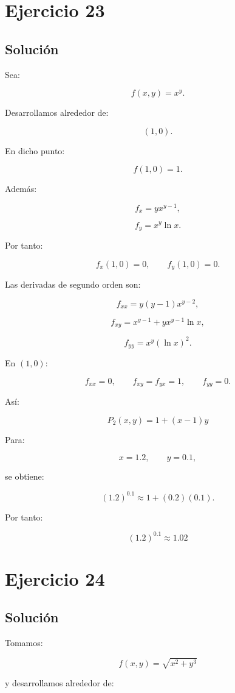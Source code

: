 \documentclass[11pt,a4paper]{article}
\begin{document}
\section{Ejercicio 23}
\subsection{Solución}

Sea:

\[
f(x,y)=x^y.
\]

Desarrollamos alrededor de:

\[
(1,0).
\]

En dicho punto:

\[
f(1,0)=1.
\]

Además:

\[
f_x
=
yx^{y-1},
\]

\[
f_y
=
x^y\ln x.
\]

Por tanto:

\[
f_x(1,0)=0,
\qquad
f_y(1,0)=0.
\]

Las derivadas de segundo orden son:

\[
f_{xx}
=
y(y-1)x^{y-2},
\]

\[
f_{xy}
=
x^{y-1}
+
yx^{y-1}\ln x,
\]

\[
f_{yy}
=
x^y(\ln x)^2.
\]

En \((1,0)\):

\[
f_{xx}=0,
\qquad
f_{xy}=f_{yx}=1,
\qquad
f_{yy}=0.
\]

Así:

\[
\boxed{
P_2(x,y)
=
1+(x-1)y
}
\]

Para:

\[
x=1.2,
\qquad
y=0.1,
\]

se obtiene:

\[
(1.2)^{0.1}
\approx
1+(0.2)(0.1).
\]

Por tanto:

\[
\boxed{
(1.2)^{0.1}
\approx
1.02
}
\]

\section{Ejercicio 24}
\subsection{Solución}

Tomamos:

\[
f(x,y)
=
\sqrt{x^2+y^3}
\]

y desarrollamos alrededor de:
\end{document}
